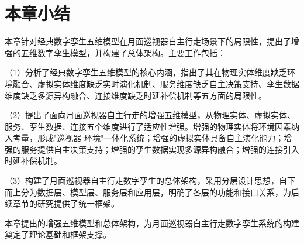 \section{本章小结}
\label{sec:ch2_summary}

本章针对经典数字孪生五维模型在月面巡视器自主行走场景下的局限性，提出了增强的五维数字孪生模型，并构建了总体架构。主要工作包括：

（1）分析了经典数字孪生五维模型的核心内涵，指出了其在物理实体维度缺乏环境融合、虚拟实体维度缺乏实时演化机制、服务维度缺乏自主决策支持、孪生数据维度缺乏多源异构融合、连接维度缺乏时延补偿机制等五方面的局限性。

（2）提出了面向月面巡视器自主行走的增强五维模型，从物理实体、虚拟实体、服务、孪生数据、连接五个维度进行了适应性增强。增强的物理实体将环境因素纳入考量，形成"巡视器-环境"一体化系统；增强的虚拟实体具备自主演化能力；增强的服务提供自主决策支持；增强的孪生数据实现多源异构融合；增强的连接引入时延补偿机制。

（3）构建了月面巡视器自主行走数字孪生的总体架构，采用分层设计思想，自下而上分为数据层、模型层、服务层和应用层，明确了各层的功能和接口关系，为后续章节的研究提供了统一框架。

本章提出的增强五维模型和总体架构，为月面巡视器自主行走数字孪生系统的构建奠定了理论基础和框架支撑。
